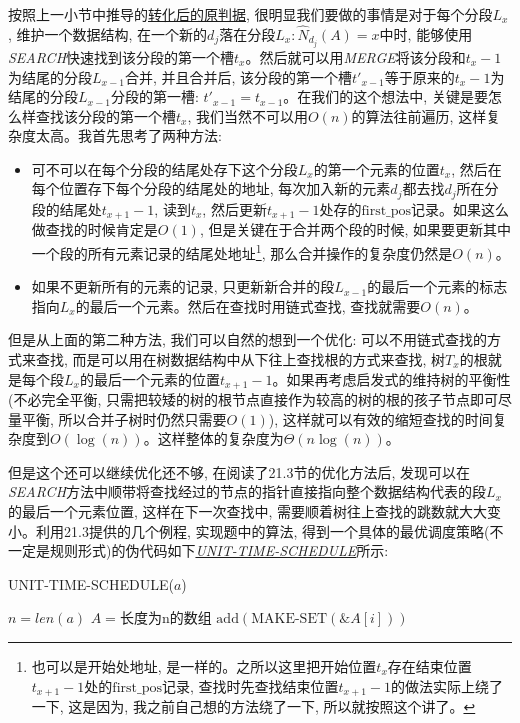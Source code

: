 \documentclass[paper=a4, fontsize=11pt]{scrartcl} %
\numberwithin{equation}{section} %
\numberwithin{figure}{section} %
\numberwithin{table}{section} %
\begin{document}
\begin{enumerate}[a]
  按照上一小节中推导的\hyperref[corollary:2]{转化后的原判据}, 很明显我们要做的事情是对于每个分段$L_x$, 维护一个数据结构, 在一个新的$d_j$落在分段$L_x: \hat{N}_{d_j}(A) = x$中时, 能够使用\textit{SEARCH}快速找到该分段的第一个槽$t_{x}$。然后就可以用\textit{MERGE}将该分段和$t_x - 1$为结尾的分段$L_{x-1}$合并, 并且合并后, 该分段的第一个槽$t'_{x-1}$等于原来的$t_x -1$为结尾的分段$L_{x-1}$分段的第一槽: $t'_{x-1} = t_{x-1}$。在我们的这个想法中, 关键是要怎么样查找该分段的第一个槽$t_{x}$, 我们当然不可以用$O(n)$的算法往前遍历, 这样复杂度太高。我首先思考了两种方法:
  \begin{itemize}
  \item 可不可以在每个分段的结尾处存下这个分段$L_x$的第一个元素的位置$t_x$, 然后在每个位置存下每个分段的结尾处的地址, 每次加入新的元素$d_j$都去找$d_j$所在分段的结尾处$t_{x+1}-1$, 读到$t_{x}$, 然后更新$t_{x+1}-1$处存的$\mbox{first\_pos}$记录。如果这么做查找的时候肯定是$O(1)$, 但是关键在于合并两个段的时候, 如果要更新其中一个段的所有元素记录的结尾处地址\footnote{也可以是开始处地址, 是一样的。之所以这里把开始位置$t_x$存在结束位置$t_{x+1}-1$处的$\mbox{first\_pos}记录$, 查找时先查找结束位置$t_{x+1}-1$的做法实际上绕了一下, 这是因为, 我之前自己想的方法绕了一下, 所以就按照这个讲了。}, 那么合并操作的复杂度仍然是$O(n)$。
  \item 如果不更新所有的元素的记录, 只更新新合并的段$L_{x-1}$的最后一个元素的标志指向$L_{x}$的最后一个元素。然后在查找时用链式查找, 查找就需要$O(n)$。
  \end{itemize}
  但是从上面的第二种方法, 我们可以自然的想到一个优化: 可以不用链式查找的方式来查找, 而是可以用在树数据结构中从下往上查找根的方式来查找, 树$T_x$的根就是每个段$L_x$的最后一个元素的位置$t_{x+1}-1$。如果再考虑启发式的维持树的平衡性(不必完全平衡, 只需把较矮的树的根节点直接作为较高的树的根的孩子节点即可尽量平衡, 所以合并子树时仍然只需要$O(1)$), 这样就可以有效的缩短查找的时间复杂度到$O(\log(n))$。这样整体的复杂度为$\Theta(n \log(n))$。

  但是这个还可以继续优化还不够, 在阅读了21.3节的优化方法后, 发现可以在\textit{SEARCH}方法中顺带将查找经过的节点的指针直接指向整个数据结构代表的段$L_x$的最后一个元素位置, 这样在下一次查找中, 需要顺着树往上查找的跳数就大大变小。利用21.3提供的几个例程, 实现题中的算法, 得到一个具体的最优调度策略(不一定是规则形式)的伪代码如下\hyperref[algo:3]{\textit{UNIT-TIME-SCHEDULE}}所示:

  \begin{algorithm}[H]
    \caption{UNIT-TIME-SCHEDULE($a$)}
    \label{algo:3}
    \begin{algorithmic}
      \State $n = len(a)$
      \State $A = \mbox{长度为n的数组}$ 
      \State $\mbox{add}(\mbox{MAKE-SET}(\&A[i]))$
      \EndFor


\end{algorithmic}
\end{algorithm}
\end{enumerate}
\end{document}
